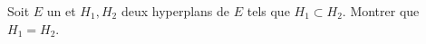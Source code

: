 \documentclass{magnolia}
\begin{document}

Soit $E$ un \Kev et $H_1, H_2$ deux hyperplans de $E$ tels que $H_1\subset H_2$. Montrer que $H_1=H_2$.















\end{document}
